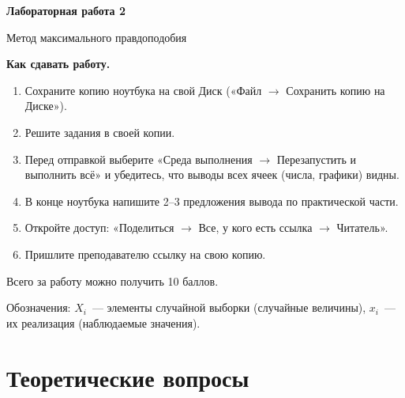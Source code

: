 \documentclass[a4paper,12pt]{article}
\begin{document}
\begin{center}
  {\Large\bfseries Лабораторная работа 2\par}
  {\large Метод максимального правдоподобия\par}
\end{center}

\textbf{Как сдавать работу.}
\begin{enumerate}[itemsep=0.3em]
  \item Сохраните копию ноутбука на свой Диск («Файл $\to$ Сохранить копию на Диске»).
  \item Решите задания в своей копии.
  \item Перед отправкой выберите «Среда выполнения $\to$ Перезапустить и выполнить всё» и убедитесь, что выводы всех ячеек (числа, графики) видны.
  \item В конце ноутбука напишите 2--3 предложения вывода по практической части.
  \item Откройте доступ: «Поделиться $\to$ Все, у кого есть ссылка $\to$ Читатель».
  \item Пришлите преподавателю ссылку на свою копию.
\end{enumerate}

Всего за работу можно получить 10 баллов.

Обозначения: $X_i$~--- элементы случайной выборки (случайные величины), $x_i$~--- их реализация (наблюдаемые значения).

\section*{Теоретические вопросы}
\end{document}
